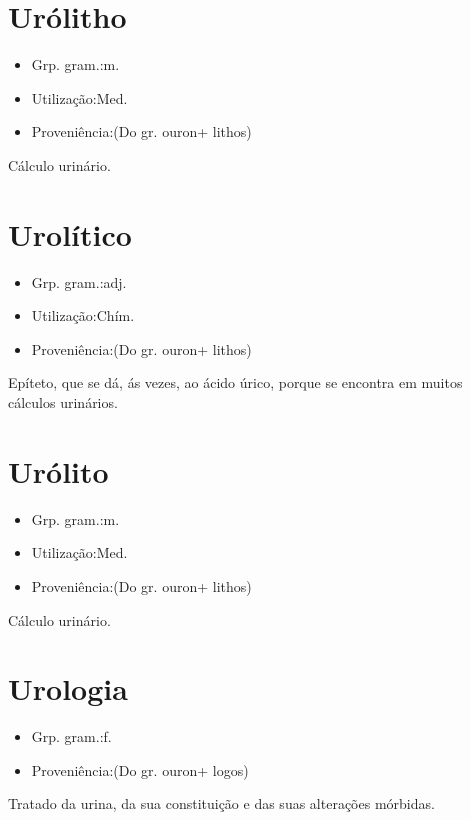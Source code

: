\documentclass{article}
\begin{document}
\section{Urólitho}
\begin{itemize}
\item {Grp. gram.:m.}
\end{itemize}
\begin{itemize}
\item {Utilização:Med.}
\end{itemize}
\begin{itemize}
\item {Proveniência:(Do gr. \textunderscore ouron\textunderscore  + \textunderscore lithos\textunderscore )}
\end{itemize}
Cálculo urinário.
\section{Urolítico}
\begin{itemize}
\item {Grp. gram.:adj.}
\end{itemize}
\begin{itemize}
\item {Utilização:Chím.}
\end{itemize}
\begin{itemize}
\item {Proveniência:(Do gr. \textunderscore ouron\textunderscore  + \textunderscore lithos\textunderscore )}
\end{itemize}
Epíteto, que se dá, ás vezes, ao ácido úrico, porque se encontra em muitos cálculos urinários.
\section{Urólito}
\begin{itemize}
\item {Grp. gram.:m.}
\end{itemize}
\begin{itemize}
\item {Utilização:Med.}
\end{itemize}
\begin{itemize}
\item {Proveniência:(Do gr. \textunderscore ouron\textunderscore  + \textunderscore lithos\textunderscore )}
\end{itemize}
Cálculo urinário.
\section{Urologia}
\begin{itemize}
\item {Grp. gram.:f.}
\end{itemize}
\begin{itemize}
\item {Proveniência:(Do gr. \textunderscore ouron\textunderscore  + \textunderscore logos\textunderscore )}
\end{itemize}
Tratado da urina, da sua constituição e das suas alterações mórbidas.
\end{document}
